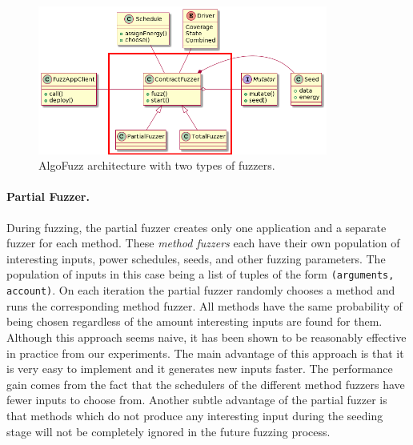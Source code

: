 \begin{figure}[htbp]
    \centering
    \includegraphics[width=0.85\textwidth]{figures/arc-fuzzers-r.png}
    \caption{AlgoFuzz architecture with two types of fuzzers.}\label{fig:architecture-fuzzers}
\end{figure}

\paragraph{Partial Fuzzer.} During fuzzing, the partial fuzzer creates only one application and a separate fuzzer for each method.
These \textit{method fuzzers} each have their own population of interesting inputs, power schedules, seeds, and other fuzzing parameters.
The population of inputs in this case being a list of tuples of the form \texttt{(arguments, account)}.
On each iteration the partial fuzzer randomly chooses a method and runs the corresponding method fuzzer.
All methods have the same probability of being chosen regardless of the amount interesting inputs are found for them.
Although this approach seems naive, it has been shown to be reasonably effective in practice from our experiments.
The main advantage of this approach is that it is very easy to implement and it generates new inputs faster.
The performance gain comes from the fact that the schedulers of the different method fuzzers have fewer inputs to choose from.
Another subtle advantage of the partial fuzzer is that methods which do not produce any interesting input during the seeding stage will not be completely ignored in the future fuzzing process.

